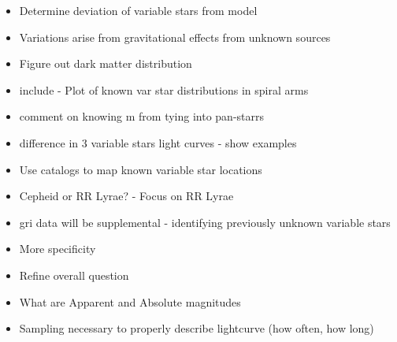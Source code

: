 \documentclass[letterpaper,11pt]{article}
\begin{document}
\begin{itemize}
	\item{} Determine deviation of variable stars from model
	\item{} Variations arise from gravitational effects from unknown sources
	\item{} Figure out dark matter distribution
	\item{} include - Plot of known var star distributions in spiral arms
	\item{} comment on knowing m from tying into pan-starrs
	\item{} difference in 3 variable stars light curves - show examples
\end{itemize}

\begin{itemize}
	\item{} Use catalogs to map known variable star locations
	\item{} Cepheid or RR Lyrae? - Focus on RR Lyrae
	\item{} gri data will be supplemental - identifying previously unknown variable stars
	\item{} More specificity
	\item{} Refine overall question
	\item{} What are Apparent and Absolute magnitudes
	\item{} Sampling necessary to properly describe lightcurve (how often, how long)
\end{itemize}
\end{document}
